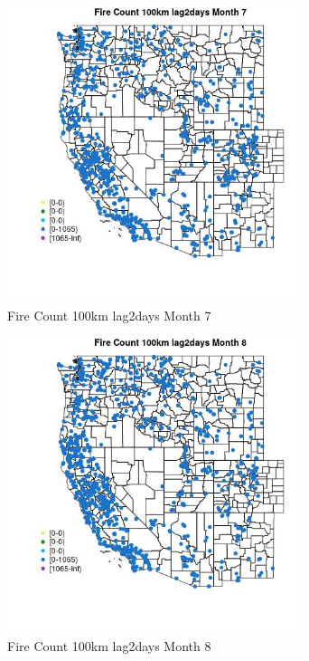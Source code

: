 \begin{figure} 
\centering  
\includegraphics[width=0.77\textwidth]{Code_Outputs/Report_ML_input_PM25_Step4_part_f_de_duplicated_aveswNAs_MapObsMo7Fire_Count_100km_lag2days.jpg} 
\caption{\label{fig:Report_ML_input_PM25_Step4_part_f_de_duplicated_aveswNAsMapObsMo7Fire_Count_100km_lag2days}Fire Count 100km lag2days Month 7} 
\end{figure} 
 

\clearpage 

\begin{figure} 
\centering  
\includegraphics[width=0.77\textwidth]{Code_Outputs/Report_ML_input_PM25_Step4_part_f_de_duplicated_aveswNAs_MapObsMo8Fire_Count_100km_lag2days.jpg} 
\caption{\label{fig:Report_ML_input_PM25_Step4_part_f_de_duplicated_aveswNAsMapObsMo8Fire_Count_100km_lag2days}Fire Count 100km lag2days Month 8} 
\end{figure} 
 

